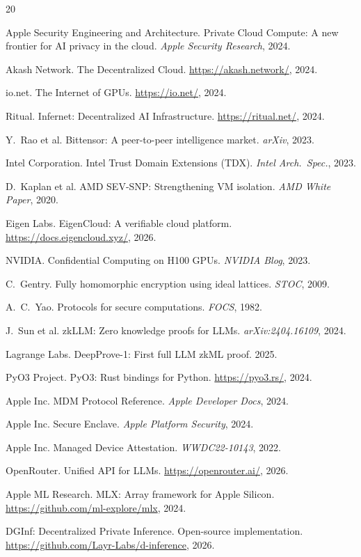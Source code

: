 \documentclass[10pt,twocolumn,letterpaper]{article}
\begin{document}

\begin{thebibliography}{20}

Apple Security Engineering and Architecture.
Private Cloud Compute: A new frontier for AI privacy in the cloud.
\emph{Apple Security Research}, 2024.

Akash Network. The Decentralized Cloud. \url{https://akash.network/}, 2024.

io.net. The Internet of GPUs. \url{https://io.net/}, 2024.

Ritual. Infernet: Decentralized AI Infrastructure. \url{https://ritual.net/}, 2024.

Y.~Rao et al. Bittensor: A peer-to-peer intelligence market. \emph{arXiv}, 2023.

Intel Corporation. Intel Trust Domain Extensions (TDX). \emph{Intel Arch.\ Spec.}, 2023.

D.~Kaplan et al. AMD SEV-SNP: Strengthening VM isolation. \emph{AMD White Paper}, 2020.

Eigen Labs. EigenCloud: A verifiable cloud platform. \url{https://docs.eigencloud.xyz/}, 2026.

NVIDIA. Confidential Computing on H100 GPUs. \emph{NVIDIA Blog}, 2023.

C.~Gentry. Fully homomorphic encryption using ideal lattices. \emph{STOC}, 2009.

A.~C.~Yao. Protocols for secure computations. \emph{FOCS}, 1982.

J.~Sun et al. zkLLM: Zero knowledge proofs for LLMs. \emph{arXiv:2404.16109}, 2024.

Lagrange Labs. DeepProve-1: First full LLM zkML proof. 2025.

PyO3 Project. PyO3: Rust bindings for Python. \url{https://pyo3.rs/}, 2024.

Apple Inc. MDM Protocol Reference. \emph{Apple Developer Docs}, 2024.

Apple Inc. Secure Enclave. \emph{Apple Platform Security}, 2024.

Apple Inc. Managed Device Attestation. \emph{WWDC22-10143}, 2022.

OpenRouter. Unified API for LLMs. \url{https://openrouter.ai/}, 2026.

Apple ML Research. MLX: Array framework for Apple Silicon. \url{https://github.com/ml-explore/mlx}, 2024.

DGInf: Decentralized Private Inference. Open-source implementation. \url{https://github.com/Layr-Labs/d-inference}, 2026.

\end{thebibliography}
\end{document}
